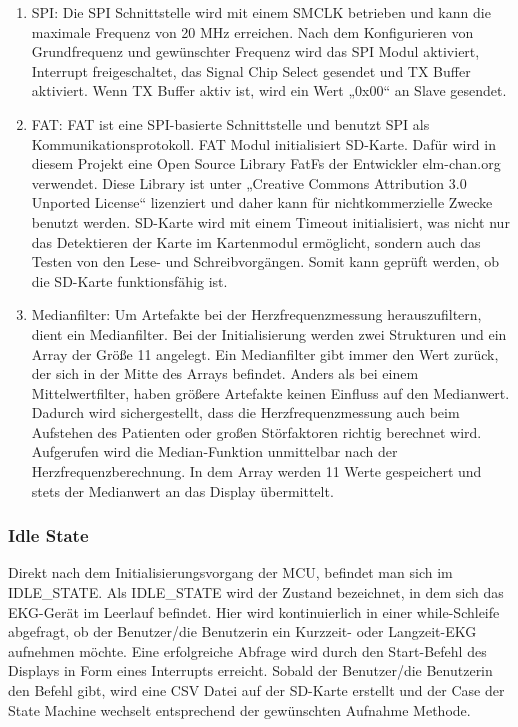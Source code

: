 \begin{enumerate}
    \item SPI: Die SPI Schnittstelle wird mit einem SMCLK betrieben und kann die maximale Frequenz von 20 MHz erreichen. Nach dem Konfigurieren von Grundfrequenz und gewünschter Frequenz wird das SPI Modul aktiviert, Interrupt freigeschaltet, das Signal Chip Select gesendet und TX Buffer aktiviert. Wenn TX Buffer aktiv ist, wird ein Wert „0x00“ an Slave gesendet. 
    \item FAT: FAT ist eine SPI-basierte Schnittstelle und benutzt SPI als Kommunikationsprotokoll. FAT Modul initialisiert SD-Karte. Dafür wird in diesem Projekt eine Open Source Library FatFs der Entwickler elm-chan.org verwendet. Diese Library ist unter „Creative Commons Attribution 3.0 Unported License“ lizenziert und daher kann für nichtkommerzielle Zwecke benutzt werden. 
    SD-Karte wird mit einem Timeout initialisiert, was nicht nur das Detektieren der Karte im Kartenmodul ermöglicht, sondern auch das Testen von den Lese- und Schreibvorgängen. Somit kann geprüft werden, ob die SD-Karte funktionsfähig ist.
    \item Medianfilter: Um Artefakte bei der Herzfrequenzmessung herauszufiltern, dient ein Medianfilter. Bei der Initialisierung werden zwei Strukturen und ein Array der Größe 11 angelegt. Ein Medianfilter gibt immer den Wert zurück, der sich in der Mitte des Arrays befindet. Anders als bei einem Mittelwertfilter, haben größere Artefakte keinen Einfluss auf den Medianwert. Dadurch wird sichergestellt, dass die Herzfrequenzmessung auch beim Aufstehen des Patienten oder großen Störfaktoren richtig berechnet wird. Aufgerufen wird die Median-Funktion unmittelbar nach der Herzfrequenzberechnung. In dem Array werden 11 Werte gespeichert und stets der Medianwert an das Display übermittelt.
\end{enumerate}

\subsubsection{Idle State}

Direkt nach dem Initialisierungsvorgang der MCU, befindet man sich im IDLE\_STATE. 
Als IDLE\_STATE wird der Zustand bezeichnet, in dem sich das EKG-Gerät im Leerlauf befindet. Hier wird kontinuierlich in einer while-Schleife abgefragt, ob der Benutzer/die Benutzerin ein Kurzzeit- oder Langzeit-EKG aufnehmen möchte.
Eine erfolgreiche Abfrage wird durch den Start-Befehl des Displays in Form eines Interrupts erreicht. Sobald der Benutzer/die Benutzerin den Befehl gibt, wird eine CSV Datei auf der SD-Karte erstellt und der Case der State Machine wechselt entsprechend der gewünschten Aufnahme Methode.

